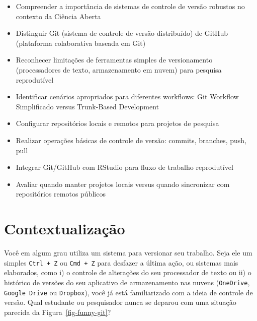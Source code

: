 \documentclass[
  a4paper,
]{book}
\providecommand{\tightlist}{%
  \setlength{\itemsep}{0pt}\setlength{\parskip}{0pt}}\usepackage{longtable,booktabs,array}
\newcommand{\emojitext}[1]{{\emoji #1}}
\begin{document}
\begin{tcolorbox}[enhanced jigsaw, colback=white, toptitle=1mm, opacityback=0, left=2mm, rightrule=.15mm, title={\emojitext{🎯} Ao final deste módulo, você será capaz de:}, coltitle=black, opacitybacktitle=0.6, breakable, toprule=.15mm, bottomtitle=1mm, titlerule=0mm, bottomrule=.15mm, arc=.35mm, leftrule=.75mm, colframe=quarto-callout-tip-color-frame, colbacktitle=quarto-callout-tip-color!10!white]

\begin{itemize}
\tightlist
\item
  Compreender a importância de sistemas de controle de versão robustos
  no contexto da Ciência Aberta
\item
  Distinguir Git (sistema de controle de versão distribuído) de GitHub
  (plataforma colaborativa baseada em Git)
\item
  Reconhecer limitações de ferramentas simples de versionamento
  (processadores de texto, armazenamento em nuvem) para pesquisa
  reprodutível
\item
  Identificar cenários apropriados para diferentes workflows: Git
  Workflow Simplificado versus Trunk-Based Development
\item
  Configurar repositórios locais e remotos para projetos de pesquisa
\item
  Realizar operações básicas de controle de versão: commits, branches,
  push, pull
\item
  Integrar Git/GitHub com RStudio para fluxo de trabalho reprodutível
\item
  Avaliar quando manter projetos locais versus quando sincronizar com
  repositórios remotos públicos
\end{itemize}

\end{tcolorbox}

\section{Contextualização}\label{contextualizauxe7uxe3o-4}

Você em algum grau utiliza um sistema para versionar seu trabalho. Seja
ele um simples \texttt{Ctrl\ +\ Z} ou \texttt{Cmd\ +\ Z} para desfazer a
última ação, ou sistemas mais elaborados, como i) o controle de
alterações do seu processador de texto ou ii) o histórico de versões do
seu aplicativo de armazenamento nas nuvens (\texttt{OneDrive},
\texttt{Google\ Drive} ou \texttt{Dropbox}), você já está familiarizado
com a ideia de controle de versão. Qual estudante ou pesquisador nunca
se deparou com uma situação parecida da Figura~\ref{fig-funny-git}?
\end{document}
